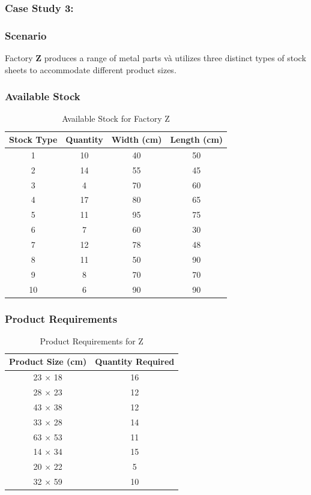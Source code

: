 \documentclass[a4paper]{article}
\begin{document}
\FloatBarrier
 \subsubsection{Case Study 3:}
\subsubsection*{Scenario}
Factory \textbf{Z} produces a range of metal parts và utilizes three distinct types of stock sheets to accommodate different product sizes.

\subsubsection*{Available Stock}
\begin{table}[H]
    \centering
    \caption{Available Stock for Factory Z}
    \begin{tabular}{|c|c|c|c|}
        \hline
        \textbf{Stock Type} & \textbf{Quantity} & \textbf{Width (cm)} & \textbf{Length (cm)} \\ \hline
        1 & 10 & 40 & 50 \\ \hline
        2 & 14 & 55 & 45 \\ \hline
        3 & 4 & 70 & 60 \\ \hline
        4 & 17 & 80 & 65 \\ \hline
        5 & 11 & 95 & 75 \\ \hline
        6 & 7 & 60 & 30 \\ \hline
        7 & 12 & 78 & 48 \\ \hline
        8 & 11 & 50 & 90 \\ \hline
        9 & 8 & 70 & 70 \\ \hline
        10 & 6 & 90 & 90 \\ \hline
    \end{tabular}
\end{table}

\subsubsection*{Product Requirements}
\begin{table}[H]
    \centering
    \caption{Product Requirements for Z}
    \begin{tabular}{|c|c|}
        \hline
        \textbf{Product Size (cm)} & \textbf{Quantity Required} \\ \hline
        23 × 18 & 16 \\ \hline
        28 × 23 & 12 \\ \hline
        43 × 38 & 12 \\ \hline
        33 × 28 & 14 \\ \hline
        63 × 53 & 11 \\ \hline
        14 × 34 & 15 \\ \hline
        20 × 22 & 5 \\ \hline
        32 × 59 & 10 \\ \hline
    \end{tabular}
\end{table}
\end{document}
